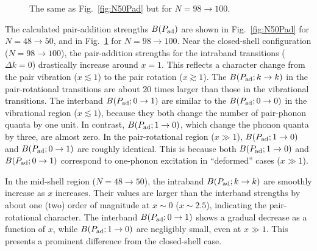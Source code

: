 \documentclass[%
superscriptaddress,
preprint,
showpacs,
nofootinbib,
amsmath,amssymb,
aps,
prc,
floatfix ]%
{revtex4-1}
\begin{document}
\begin{figure}[htbp]
\begin{minipage}{0.3\hsize}
\begin{center}
 \end{center}
 \captionsetup{labelformat=empty,labelsep=none}
 \end{minipage}
 \caption{
The same as Fig.~\ref{fig:N50Pad} but for $N=98\rightarrow 100$.
}
 \label{fig:N100Pad}
\end{figure}

The calculated pair-addition strengths $B(P_{\rm ad})$ are shown in
Fig.~\ref{fig:N50Pad} for $N=48\rightarrow 50$,
and in Fig.~\ref{fig:N100Pad} for $N=98\rightarrow 100$.
Near the closed-shell configuration ($N=98\rightarrow 100$),
the pair-addition strengths for the intraband transitions ($\Delta k=0$)
drastically increase around $x=1$.
This reflects a character change from the pair vibration ($x\lesssim 1$)
to the pair rotation ($x\gtrsim 1$).
The $B(P_{\rm ad}; k\rightarrow k)$ in the pair-rotational transitions
are about 20 times larger than those in the vibrational transitions.
The interband $B(P_{\rm ad}; 0\rightarrow 1)$ are similar to
the $B(P_{\rm ad}; 0\rightarrow 0)$ in the vibrational region
($x\lesssim 1$), because they both change the number of pair-phonon quanta
by one unit.
In contrast, $B(P_{\rm ad}; 1\rightarrow 0)$, which change the phonon
quanta by three, are almost zero.
In the pair-rotational region ($x \gg 1$),
$B(P_{\rm ad}; 1\rightarrow 0)$ and $B(P_{\rm ad}; 0\rightarrow 1)$
are roughly identical. This is because both $B(P_{\rm ad}; 1\rightarrow 0)$ 
and $B(P_{\rm ad}; 0\rightarrow 1)$ correspond to one-phonon excitation
in ``deformed'' cases ($x \gg 1$).

In the mid-shell region ($N=48\rightarrow 50$),
the intraband $B(P_{\rm ad}; k\rightarrow k)$ are smoothly increase as
$x$ increases.
Their values are larger than the interband strengths by about one (two) order
of magnitude at $x\sim 0$ ($x\sim 2.5$),
indicating the pair-rotational character.
The interband $B(P_{\rm ad}; 0\rightarrow 1)$ shows a gradual decrease
as a function of $x$, while
$B(P_{\rm ad}; 1\rightarrow 0)$ are negligibly small,
even at $x\gg 1$.
This presents a prominent difference from the closed-shell case.
\end{document}
